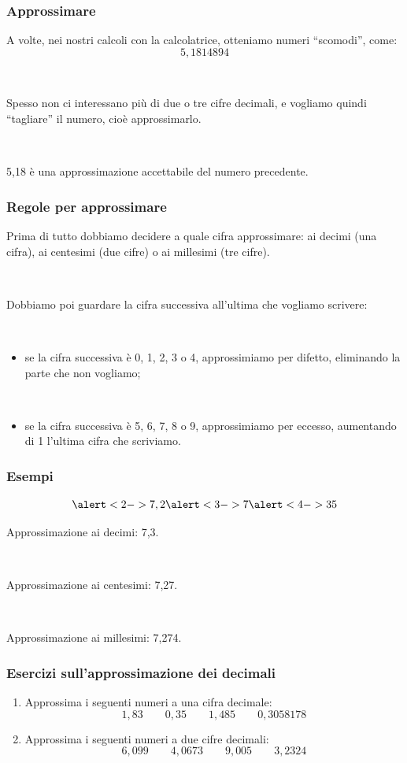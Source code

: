\documentclass[handout]{beamer}
\theoremstyle{plain}
\begin{document}
\begin{frame}
\frametitle{Approssimare}
A volte, nei nostri calcoli con la calcolatrice, otteniamo numeri ``scomodi'', come:
\[5,1814894\]

~

Spesso non ci interessano più di \alert{due o tre cifre decimali}, e vogliamo quindi ``tagliare'' il numero, cioè \alert{approssimarlo}.\pause

~

5,18 è una approssimazione accettabile del numero precedente.
\end{frame}



\begin{frame}
\frametitle{Regole per approssimare}
Prima di tutto dobbiamo \alert{decidere a quale cifra approssimare}: ai decimi (una cifra), ai centesimi (due cifre) o ai millesimi (tre cifre).\pause

~

Dobbiamo poi guardare \alert{la cifra successiva all'ultima che vogliamo scrivere}:\pause

~
\begin{itemize}
  \item se la cifra successiva è 0, 1, 2, 3 o 4, approssimiamo per \alert{difetto}, eliminando la parte che non vogliamo;\pause
  
  ~
  \item se la cifra successiva è 5, 6, 7, 8 o 9, approssimiamo per \alert{eccesso}, aumentando di 1 l'ultima cifra che scriviamo.
\end{itemize}
\end{frame}



\begin{frame}
\frametitle{Esempi}
\[\alert<2->{7,2}\alert<3->{7}\alert<4->{3}5\]\pause

Approssimazione ai decimi: 7,3.\pause

~

Approssimazione ai centesimi: 7,27.\pause

~

Approssimazione ai millesimi: 7,274.
\end{frame}




\begin{frame}
\frametitle{Esercizi sull'approssimazione dei decimali}
\begin{enumerate}
  \item Approssima i seguenti numeri a una cifra decimale:
    \[ 1,83\qquad0,35\qquad1,485\qquad0,3058178 \]
  \item Approssima i seguenti numeri a due cifre decimali:
    \[ 6,099\qquad4,0673\qquad9,005\qquad3,2324 \]

\end{enumerate}
\end{frame}
\end{document}
